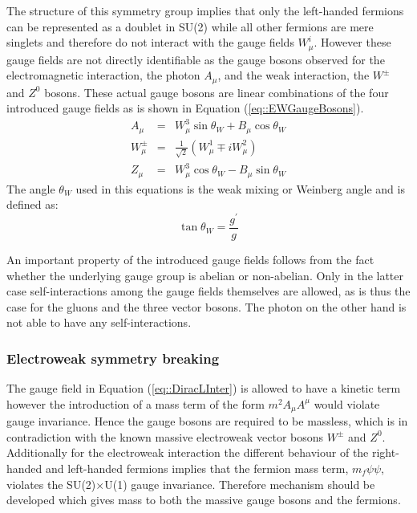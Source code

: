 \begin{myindentpar}
\begin{description}
    The structure of this symmetry group implies that only the left-handed fermions can be represented as a doublet in SU(2) while all other fermions are mere singlets and therefore do not interact with the gauge fields $W_{\mu}^{i}$. However these gauge fields are not directly identifiable as the gauge bosons observed for the electromagnetic interaction, the photon $A_{\mu}$, and the weak interaction, the $W^{\pm}$ and $Z^{0}$ bosons. These actual gauge bosons are linear combinations of the four introduced gauge fields as is shown in Equation (\ref{eq::EWGaugeBosons}).
    \begin{eqnarray}
     A_{\mu} & = & W_{\mu}^{3} \sin \theta_{W} + B_{\mu} \cos \theta_{W} \nonumber \\
     W_{\mu}^{\pm} & = & \frac{1}{\sqrt{2}} \left( W_{\mu}^{1} \mp i W_{\mu}^{2} \right) \label{eq::EWGaugeBosons} \\
     Z_{\mu} & = & W_{\mu}^{3} \cos \theta_{W} - B_{\mu} \sin \theta_{W} \nonumber
    \end{eqnarray}
    The angle $\theta_{W}$ used in this equations is the weak mixing or Weinberg angle and is defined as:
    \begin{equation}
     \tan \theta_{W} = \frac{g^{'}}{g}
    \end{equation}
    
   \end{description}
\end{myindentpar}

An important property of the introduced gauge fields follows from the fact whether the underlying gauge group is abelian or non-abelian. Only in the latter case self-interactions among the gauge fields themselves are allowed, as is thus the case for the gluons and the three vector bosons. The photon on the other hand is not able to have any self-interactions.

\subsubsection{Electroweak symmetry breaking}
The gauge field in Equation (\ref{eq::DiracLInter}) is allowed to have a kinetic term however the introduction of a mass term of the form $m^{2} A_{\mu}A^{\mu}$ would violate gauge invariance. Hence the gauge bosons are required to be massless, which is in contradiction with the known massive electroweak vector bosons $W^{\pm}$ and $Z^0$. Additionally for the electroweak interaction the different behaviour of the right-handed and left-handed fermions implies that the fermion mass term, $m_{f} \psi \psi$, violates the SU(2)$\times$U(1) gauge invariance. Therefore mechanism should be developed which gives mass to both the massive gauge bosons and the fermions.
\\

